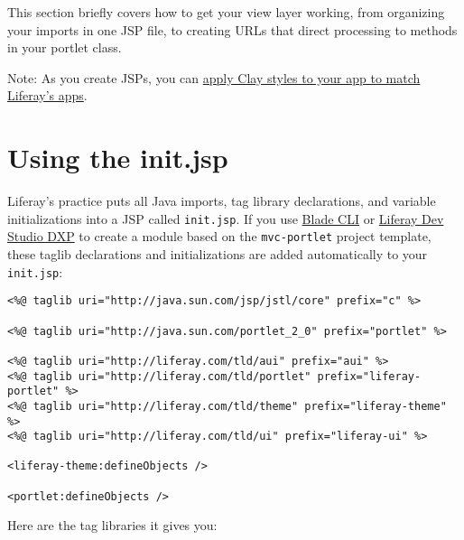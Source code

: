This section briefly covers how to get your view layer working, from
organizing your imports in one JSP file, to creating URLs that direct
processing to methods in your portlet class.

\noindent\hrulefill

Note: As you create JSPs, you can
\href{/docs/7-1/tutorials/-/knowledge_base/t/applying-clay-styles-to-your-app}{apply
Clay styles to your app to match Liferay's apps}.

\noindent\hrulefill

\section{Using the init.jsp}\label{using-the-init.jsp}

Liferay's practice puts all Java imports, tag library declarations, and
variable initializations into a JSP called \texttt{init.jsp}. If you use
\href{/docs/7-1/tutorials/-/knowledge_base/t/blade-cli}{Blade CLI} or
\href{/docs/7-1/tutorials/-/knowledge_base/t/liferay-ide}{Liferay Dev
Studio DXP} to create a module based on the \texttt{mvc-portlet} project
template, these taglib declarations and initializations are added
automatically to your \texttt{init.jsp}:

\begin{verbatim}
<%@ taglib uri="http://java.sun.com/jsp/jstl/core" prefix="c" %>

<%@ taglib uri="http://java.sun.com/portlet_2_0" prefix="portlet" %>

<%@ taglib uri="http://liferay.com/tld/aui" prefix="aui" %>
<%@ taglib uri="http://liferay.com/tld/portlet" prefix="liferay-portlet" %>
<%@ taglib uri="http://liferay.com/tld/theme" prefix="liferay-theme" %>
<%@ taglib uri="http://liferay.com/tld/ui" prefix="liferay-ui" %>

<liferay-theme:defineObjects />

<portlet:defineObjects />
\end{verbatim}

Here are the tag libraries it gives you:

